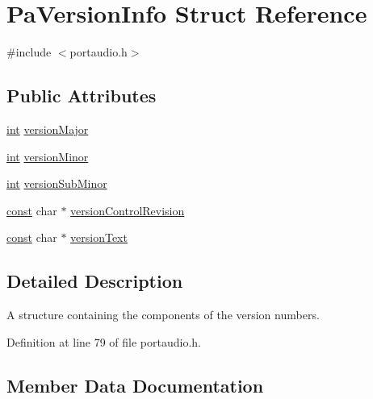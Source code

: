 \hypertarget{struct_pa_version_info}{}\section{Pa\+Version\+Info Struct Reference}
\label{struct_pa_version_info}


{\ttfamily \#include $<$portaudio.\+h$>$}

\subsection*{Public Attributes}
\begin{DoxyCompactItemize}
\item 
\hyperlink{xmltok_8h_a5a0d4a5641ce434f1d23533f2b2e6653}{int} \hyperlink{struct_pa_version_info_aae9ff4383171955022ebd26c0c0d4d2e}{version\+Major}
\item 
\hyperlink{xmltok_8h_a5a0d4a5641ce434f1d23533f2b2e6653}{int} \hyperlink{struct_pa_version_info_aee2f42cc57f0a018481d73e016722952}{version\+Minor}
\item 
\hyperlink{xmltok_8h_a5a0d4a5641ce434f1d23533f2b2e6653}{int} \hyperlink{struct_pa_version_info_aa789c4034fc38c91ffecb4f81fc3ae6b}{version\+Sub\+Minor}
\item 
\hyperlink{getopt1_8c_a2c212835823e3c54a8ab6d95c652660e}{const} char $\ast$ \hyperlink{struct_pa_version_info_a4f8c2b786c9d5013e978e1218ad9ab22}{version\+Control\+Revision}
\item 
\hyperlink{getopt1_8c_a2c212835823e3c54a8ab6d95c652660e}{const} char $\ast$ \hyperlink{struct_pa_version_info_ab876696c6563c35fdcb8c18f77ff12f5}{version\+Text}
\end{DoxyCompactItemize}


\subsection{Detailed Description}
A structure containing the components of the version numbers. 

Definition at line 79 of file portaudio.\+h.



\subsection{Member Data Documentation}
